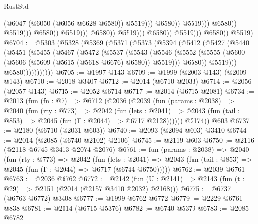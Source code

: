 \begin{lexlean}{RustStd}
\begin{coremodule}
                                                                (@6047
                                                                  (@6050 (@6056 @6628 @6580))
                                                                  @5519)))
                                                            @6580))
                                                        @5519)))
                                                  @6580))
                                              @5519)))
                                        @6580))
                                    @5519)))
                              @6580))
                          @5519)))
                    @6580))
                @5519)))
          @6580))
      @5519)
@6704 := @5303
    (@5328
      (@5369
        (@5371
          (@5373
            (@5394
              (@5412
                (@5427
                  (@5440
                    (@5451
                      (@5455
                        (@5467
                          (@5472
                            (@5537
                              (@5543
                                (@5546
                                  (@5552
                                    (@5555
                                      (@5600 (@5606 (@5609 (@5615 (@5618 @6676) @6580)) @5519)))
                                    @6580))
                                @5519)))
                          @6580)))))))))))
@6705 := @1997 @143
@6709 := @1999 (@2003 @143) (@2009 @143)
@6710 := @2018 @3407
@6712 := @2014 (@6710 @2033)
@6714 := @2056 (@2057 @143)
@6715 := @2052 @6714
@6717 := @2014 (@6715 @2081)
@6734 := @2013
    (fun (fn : @7) =>
    @6712
      (@2036
        (@2039
          (fun (params : @2038) =>
          @2040
            (fun (rty : @773) =>
            @2042
              (fun (lets : @2041) =>
              @2043 (fun (tail : @853) => @2045 (fun (Γ : @2044) => @6717 @2128))))))
        @2174))
    @603
@6737 := @2180 (@6710 (@2031 @603))
@6740 := @2093 (@2094 @603) @3410
@6744 := @2014 (@2085 (@6740 @2102) @2106)
@6745 := @2119 @603
@6750 := @2116 (@2118 @6745 @3413 @2074 @2076)
@6761 := fun (params : @2038) =>
  @2040
    (fun (rty : @773) =>
    @2042
      (fun (lets : @2041) =>
      @2043 (fun (tail : @853) => @2045 (fun (Γ : @2044) => @6717 (@6744 @6750)))))
@6762 := @2039 @6761
@6763 := @2036 @6762
@6772 := @2142 (fun (U : @2141) => @2143 (fun (t : @29) => @2151 (@2014 (@2157 @3410 @2032) @2168)))
@6775 := @6737 (@6763 @6772) @3408
@6777 := @1999 @6762 @6772
@6779 := @2229 @6761 @838
@6781 := @2014 (@6715 @5376)
@6782 := @6740 @5379
@6783 := @2085 @6782

\end{coremodule}
\end{lexlean}
